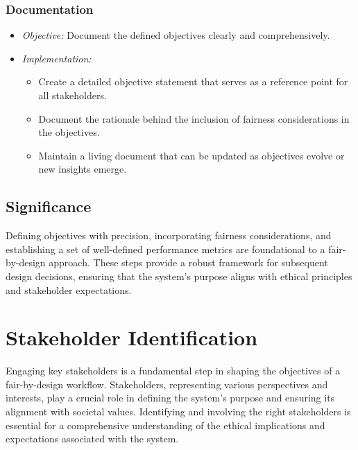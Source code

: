 \documentclass[12pt,a4paper,openright,twoside]{book}
\begin{document}
\subsubsection{Documentation}

\begin{itemize}

    \item \emph{Objective:} Document the defined objectives clearly and comprehensively.

    \item \emph{Implementation:}

        \begin{itemize}

            \item Create a detailed objective statement that serves as a reference point for all stakeholders.

            \item Document the rationale behind the inclusion of fairness considerations in the objectives.

            \item Maintain a living document that can be updated as objectives evolve or new insights emerge.

        \end{itemize}

\end{itemize}

\subsection{Significance}

Defining objectives with precision, incorporating fairness considerations, and establishing a set of well-defined performance metrics are foundational to a fair-by-design approach. These steps provide a robust framework for subsequent design decisions, ensuring that the system's purpose aligns with ethical principles and stakeholder expectations.

\section{Stakeholder Identification}

Engaging key stakeholders is a fundamental step in shaping the objectives of a fair-by-design workflow. Stakeholders, representing various perspectives and interests, play a crucial role in defining the system's purpose and ensuring its alignment with societal values. Identifying and involving the right stakeholders is essential for a comprehensive understanding of the ethical implications and expectations associated with the system.
\end{document}

